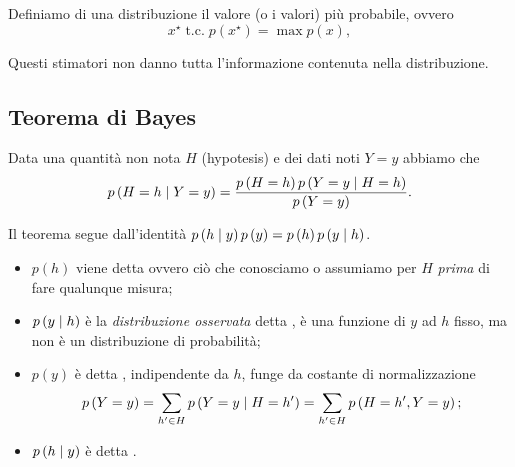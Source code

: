 \documentclass[10pt]{article}
\newcommand{\pare}[1]{
	\ensuremath{\left(#1\right)}
}
\begin{document}
\begin{definition}[Moda]
Definiamo  di una distribuzione il valore (o i valori) più probabile, ovvero
\begin{equation}
x^\star \;\text{t.c.}\; p\pare{x^\star} = \max p\pare{x},
\end{equation}
\end{definition}

Questi stimatori non danno tutta l'informazione contenuta nella distribuzione.

\subsection{Teorema di Bayes}

\begin{theorem}\label{teo:bayes}
Data una quantità non nota $H$ (hypotesis) e dei dati noti $Y=y$ abbiamo che
\begin{equation}
p\pare{H=h\cond Y=y} = \frac{p\pare{H=h}p\pare{Y=y\cond H=h}}{p\pare{Y=y}}.
\end{equation}
\end{theorem}
Il teorema segue dall'identità $p\pare{h\cond y} p\pare{y} = p\pare{h} p\pare{y\cond h}$.
\begin{itemize}
\item $p\pare{h}$ viene detta  ovvero ciò che conosciamo o assumiamo per $H$ \textit{prima} di fare qualunque misura;
\item $p\pare{y\cond h}$ è la \textit{distribuzione osservata} detta , è una funzione di $y$ ad $h$ fisso, ma non è un distribuzione di probabilità;
\item $p\pare{y}$ è detta , indipendente da $h$, funge da costante di normalizzazione \[
p\pare{Y=y} = \sum_{h'\in H}p\pare{Y=y \cond H=h'} = \sum_{h'\in H}p\pare{H=h', Y=y};
\]
\item $p\pare{h\cond y}$ è detta .
\end{itemize}
\end{document}
